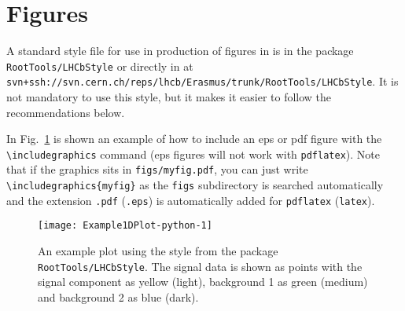 
\section{Figures}
\label{sec:Figures}

A standard \lhcb style file for use in production of figures in \root
is in the \erasmus package \texttt{RootTools/LHCbStyle} or directly in
\svn at
\texttt{svn+ssh://svn.cern.ch/reps/lhcb/Erasmus/trunk/RootTools/LHCbStyle}. It
is not mandatory to use this style, but it makes it easier to follow
the recommendations below.

In Fig.~\ref{fig:example} is shown an example of how to include an eps
or pdf figure with the \texttt{\textbackslash includegraphics} command
(eps figures will not work with \texttt{pdflatex}). Note that if the
graphics sits in \texttt{figs/myfig.pdf}, you can just write
\texttt{\textbackslash includegraphics\{myfig\}} as the \texttt{figs}
subdirectory is searched automatically and the extension \texttt{.pdf}
(\texttt{.eps}) is automatically added for \texttt{pdflatex}
(\texttt{latex}).
\begin{figure}[tb]
  \begin{center}
    \texttt{[image: Example1DPlot-python-1]}
    \vspace*{-1.0cm}
  \end{center}
  \caption{
    \small %
    An example plot using the \lhcb style from the \erasmus package
    \texttt{RootTools/LHCbStyle}. The signal data is shown as points
    with the signal component as yellow (light), background 1 as green
    (medium) and background 2 as blue (dark).}
  \label{fig:example}
\end{figure}

